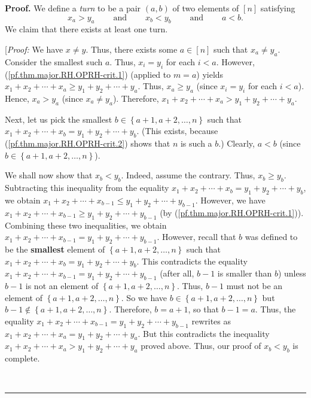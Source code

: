 \documentclass[numbers=enddot,12pt,final,onecolumn,notitlepage]{scrartcl}%
\numberwithin{exer}{subsection}
\theoremstyle{definition}
\newenvironment{proof}[1][Proof]{\noindent\textbf{#1.} }{\ \rule{0.5em}{0.5em}}
\begin{document}
\begin{proof}
We define a \emph{turn} to be a pair $\left(  a,b\right)  $ of two elements of
$\left[  n\right]  $ satisfying
\[
x_{a}>y_{a}\ \ \ \ \ \ \ \ \ \ \text{and}\ \ \ \ \ \ \ \ \ \ x_{b}%
<y_{b}\ \ \ \ \ \ \ \ \ \ \text{and}\ \ \ \ \ \ \ \ \ \ a<b.
\]
We claim that there exists at least one turn.

[\textit{Proof:} We have $x\neq y$. Thus, there exists some $a\in\left[
n\right]  $ such that $x_{a}\neq y_{a}$. Consider the smallest such $a$. Thus,
$x_{i}=y_{i}$ for each $i<a$. However, (\ref{pf.thm.major.RH.OPRH-crit.1})
(applied to $m=a$) yields $x_{1}+x_{2}+\cdots+x_{a}\geq y_{1}+y_{2}%
+\cdots+y_{a}$. Thus, $x_{a}\geq y_{a}$ (since $x_{i}=y_{i}$ for each $i<a$).
Hence, $x_{a}>y_{a}$ (since $x_{a}\neq y_{a}$). Therefore, $x_{1}+x_{2}%
+\cdots+x_{a}>y_{1}+y_{2}+\cdots+y_{a}$.

Next, let us pick the smallest $b\in\left\{  a+1,a+2,\ldots,n\right\}  $ such
that $x_{1}+x_{2}+\cdots+x_{b}=y_{1}+y_{2}+\cdots+y_{b}$. (This exists,
because (\ref{pf.thm.major.RH.OPRH-crit.2}) shows that $n$ is such a $b$.)
Clearly, $a<b$ (since $b\in\left\{  a+1,a+2,\ldots,n\right\}  $).

We shall now show that $x_{b}<y_{b}$. Indeed, assume the contrary. Thus,
$x_{b}\geq y_{b}$. Subtracting this inequality from the equality $x_{1}%
+x_{2}+\cdots+x_{b}=y_{1}+y_{2}+\cdots+y_{b}$, we obtain $x_{1}+x_{2}%
+\cdots+x_{b-1}\leq y_{1}+y_{2}+\cdots+y_{b-1}$. However, we have $x_{1}%
+x_{2}+\cdots+x_{b-1}\geq y_{1}+y_{2}+\cdots+y_{b-1}$ (by
(\ref{pf.thm.major.RH.OPRH-crit.1})). Combining these two inequalities, we
obtain $x_{1}+x_{2}+\cdots+x_{b-1}=y_{1}+y_{2}+\cdots+y_{b-1}$. However,
recall that $b$ was defined to be the \textbf{smallest} element of $\left\{
a+1,a+2,\ldots,n\right\}  $ such that $x_{1}+x_{2}+\cdots+x_{b}=y_{1}%
+y_{2}+\cdots+y_{b}$. This contradicts the equality $x_{1}+x_{2}%
+\cdots+x_{b-1}=y_{1}+y_{2}+\cdots+y_{b-1}$ (after all, $b-1$ is smaller than
$b$) unless $b-1$ is not an element of $\left\{  a+1,a+2,\ldots,n\right\}  $.
Thus, $b-1$ must not be an element of $\left\{  a+1,a+2,\ldots,n\right\}  $.
So we have $b\in\left\{  a+1,a+2,\ldots,n\right\}  $ but $b-1\notin\left\{
a+1,a+2,\ldots,n\right\}  $. Therefore, $b=a+1$, so that $b-1=a$. Thus, the
equality $x_{1}+x_{2}+\cdots+x_{b-1}=y_{1}+y_{2}+\cdots+y_{b-1}$ rewrites as
$x_{1}+x_{2}+\cdots+x_{a}=y_{1}+y_{2}+\cdots+y_{a}$. But this contradicts the
inequality $x_{1}+x_{2}+\cdots+x_{a}>y_{1}+y_{2}+\cdots+y_{a}$ proved above.
Thus, our proof of $x_{b}<y_{b}$ is complete.


\end{proof}
\end{document}
